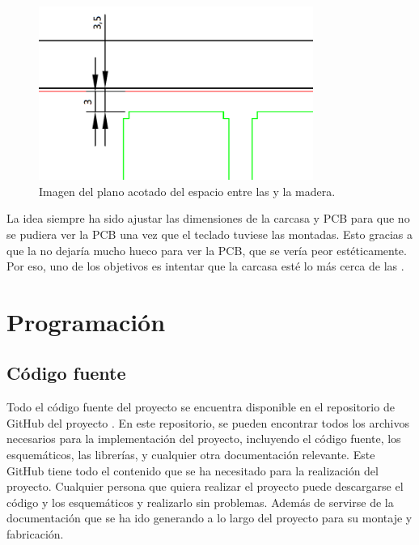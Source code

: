 \begin{figure}[H]
    \centering
    \includegraphics[width=0.8\textwidth]{imagenes/Capitulos/Cap05/AcotadoPCBMadera.png}
    \caption{Imagen del plano acotado del espacio entre las  y la madera.}
    \label{fig:PlanoSeparacionMadera}
\end{figure}

La idea siempre ha sido ajustar las dimensiones de la carcasa y \gls{PCB} para que no se pudiera ver la \gls{PCB} una vez que el teclado tuviese las  montadas. Esto gracias a que la  no dejaría mucho hueco para ver la \gls{PCB}, que se vería peor estéticamente. Por eso, uno de los objetivos es intentar que la carcasa esté lo más cerca de las .
\newpage

\section{Programación}
\subsection{Código fuente}\label{ApendiceCodigoFuente}

Todo el código fuente del proyecto se encuentra disponible en el repositorio de GitHub del proyecto \cite{ModernWoodGitHub}. En este repositorio, se pueden encontrar todos los archivos necesarios para la implementación del proyecto, incluyendo el código fuente, los esquemáticos, las librerías, y cualquier otra documentación relevante. Este GitHub tiene todo el contenido que se ha necesitado para la realización del proyecto. Cualquier persona que quiera realizar el proyecto puede descargarse el código y los esquemáticos y realizarlo sin problemas. Además de servirse de la documentación que se ha ido generando a lo largo del proyecto para su montaje y fabricación.

